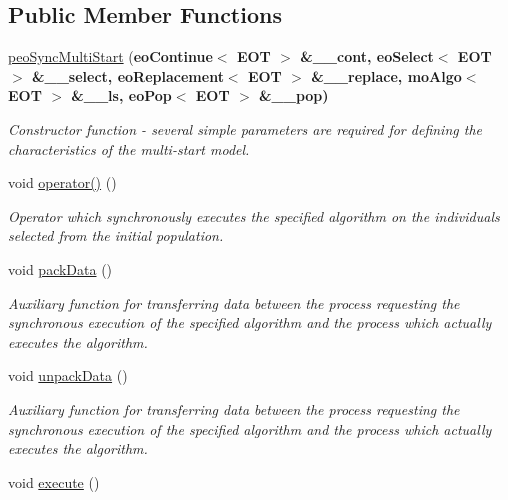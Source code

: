 \subsection*{Public Member Functions}
\begin{CompactItemize}
\item 
\hyperlink{classpeoSyncMultiStart_d29f94aad3c1f443bfffc8b6aee0704c}{peo\-Sync\-Multi\-Start} (\bf{eo\-Continue}$<$ EOT $>$ \&\_\-\_\-cont, \bf{eo\-Select}$<$ EOT $>$ \&\_\-\_\-select, \bf{eo\-Replacement}$<$ EOT $>$ \&\_\-\_\-replace, \bf{mo\-Algo}$<$ EOT $>$ \&\_\-\_\-ls, \bf{eo\-Pop}$<$ EOT $>$ \&\_\-\_\-pop)
\begin{CompactList}\small\item\em Constructor function - several simple parameters are required for defining the characteristics of the multi-start model. \item\end{CompactList}\item 
void \hyperlink{classpeoSyncMultiStart_76385b33fe514f91cb83f0fbecbeb3c2}{operator()} ()
\begin{CompactList}\small\item\em Operator which synchronously executes the specified algorithm on the individuals selected from the initial population. \item\end{CompactList}\item 
void \hyperlink{classpeoSyncMultiStart_8becfab1922b64708dca5a53e2932a5a}{pack\-Data} ()
\begin{CompactList}\small\item\em Auxiliary function for transferring data between the process requesting the synchronous execution of the specified algorithm and the process which actually executes the algorithm. \item\end{CompactList}\item 
void \hyperlink{classpeoSyncMultiStart_2903a441b77cded266b5fb651e17a5b5}{unpack\-Data} ()
\begin{CompactList}\small\item\em Auxiliary function for transferring data between the process requesting the synchronous execution of the specified algorithm and the process which actually executes the algorithm. \item\end{CompactList}\item 
void \hyperlink{classpeoSyncMultiStart_a4d1c2943c290de540800087b54dc49b}{execute} ()

\end{CompactItemize}
